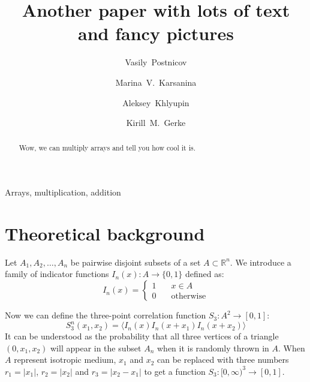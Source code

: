 \documentclass[1p]{elsarticle}
\begin{document}
\author[Smith]{Vasily~Postnicov}
\author[Smith]{Marina~V.~Karsanina}
\author[Smith,MIT]{Aleksey~Khlyupin}
\author[Smith]{Kirill~M.~Gerke}

\address[Smith]{Schmidt Institute of Physics of the Earth of Russian Academy of
  Sciences, Moscow, 107031, Russia}
\address[MIT]{Moscow Institute of Physics and Technology,
  Dolgoprudny, 141701, Russia}

\title{Another paper with lots of text and fancy pictures}

\begin{abstract}
  Wow, we can multiply arrays and tell you how cool it is.
\end{abstract}

\begin{keyword}
  Arrays, multiplication, addition
\end{keyword}

\maketitle

\section{Theoretical background}
Let $A_1, A_2, \dots, A_n$ be pairwise disjoint subsets of a set
$A \subset \mathbb{R}^n$. We introduce a family of indicator functions
$I_n(x) : A \rightarrow \{0,1\}$ defined as:
\begin{equation}
  I_n(x) = \left\{
  \begin{array}{ll}
    1 & \quad x \in A \\
    0 & \quad \text{otherwise}
  \end{array}
  \right.
\end{equation}

Now we can define the three-point correlation function $S_3: A^2 \rightarrow [0, 1]$:
\begin{equation}
  S_3^n(x_1, x_2) = \langle I_n(x) I_n(x + x_1) I_n(x + x_2) \rangle
\end{equation}
It can be understood as the probability that all three vertices of a triangle
$(0, x_1, x_2)$ will appear in the subset $A_n$ when it is randomly thrown in
$A$. When $A$ represent isotropic medium, $x_1$ and $x_2$ can be replaced with
three numbers $r_1 = |x_1|$, $r_2 = |x_2|$ and $r_3 = |x_2 - x_1|$ to get a
function $S_3: [0, \infty)^3 \rightarrow [0, 1]$.
\end{document}
